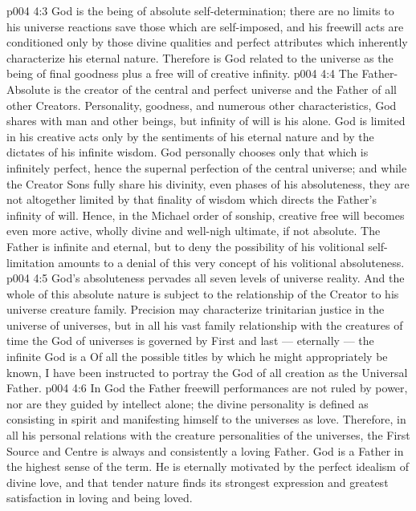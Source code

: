 \vs p004 4:3 God is the being of absolute self\hyp{}determination; there are no limits to his universe reactions save those which are self\hyp{}imposed, and his freewill acts are conditioned only by those divine qualities and perfect attributes which inherently characterize his eternal nature. Therefore is God related to the universe as the being of final goodness plus a free will of creative infinity.
\vs p004 4:4 The Father\hyp{}Absolute is the creator of the central and perfect universe and the Father of all other Creators. Personality, goodness, and numerous other characteristics, God shares with man and other beings, but infinity of will is his alone. God is limited in his creative acts only by the sentiments of his eternal nature and by the dictates of his infinite wisdom. God personally chooses only that which is infinitely perfect, hence the supernal perfection of the central universe; and while the Creator Sons fully share his divinity, even phases of his absoluteness, they are not altogether limited by that finality of wisdom which directs the Father’s infinity of will. Hence, in the Michael order of sonship, creative free will becomes even more active, wholly divine and well\hyp{}nigh ultimate, if not absolute. The Father is infinite and eternal, but to deny the possibility of his volitional self\hyp{}limitation amounts to a denial of this very concept of his volitional absoluteness.
\vs p004 4:5 \pc God’s absoluteness pervades all seven levels of universe reality. And the whole of this absolute nature is subject to the relationship of the Creator to his universe creature family. Precision may characterize trinitarian justice in the universe of universes, but in all his vast family relationship with the creatures of time the God of universes is governed by  First and last --- eternally --- the infinite God is a  Of all the possible titles by which he might appropriately be known, I have been instructed to portray the God of all creation as the Universal Father.
\vs p004 4:6 In God the Father freewill performances are not ruled by power, nor are they guided by intellect alone; the divine personality is defined as consisting in spirit and manifesting himself to the universes as love. Therefore, in all his personal relations with the creature personalities of the universes, the First Source and Centre is always and consistently a loving Father. God is a Father in the highest sense of the term. He is eternally motivated by the perfect idealism of divine love, and that tender nature finds its strongest expression and greatest satisfaction in loving and being loved.
